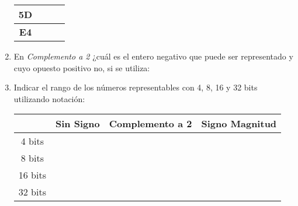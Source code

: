 \documentclass[12pt]{article}
\begin{document}
\begin{enumerate}
\begin{center}
\begin{tabular}[t]{|c|c|c|c|}
            \textbf{5D}&&&\\

            \hline

            \textbf{E4}&&&\\

            \hline

            \end{tabular}

        \end{center}

    \item En \emph{Complemento a 2} ¿cuál es el entero negativo que puede ser
        representado y cuyo opuesto positivo no, si se utiliza:


    \item Indicar el rango de los números representables con 4, 8, 16 y 32
        bits utilizando notación:

        \begin{center}

            \begin{tabular}[t]{|c|c|c|c|}

            \hline

                 & \textbf{Sin Signo} & \textbf{Complemento a 2} &
                 \textbf{Signo Magnitud}\\

            \hline

                4 bits & \hspace{9em}~ &\hspace{9em}~&\hspace{9em}~\\

            \hline

            8 bits&&&\\

            \hline

            16 bits&&&\\

            \hline

            32 bits&&&\\

            \hline

            \end{tabular}

        \end{center}

\end{enumerate}
\end{document}
